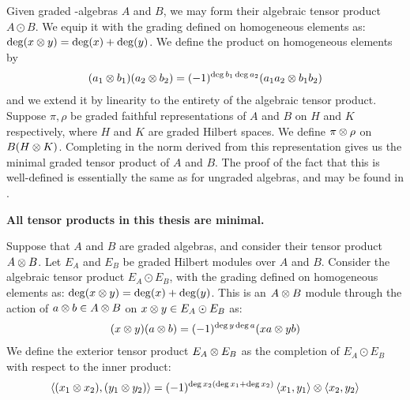 \begin{definition}
	Given graded \Cstar-algebras $A$ and $B$, we may form their algebraic tensor product $A\odot B$. We equip it with the grading defined on homogeneous elements as: $\deg(x\otimes y)=\deg(x)+\deg(y)$. We define the product on homogeneous elements by 
	\begin{align*}
		(a_1\otimes b_1)(a_2\otimes b_2)=(-1)^{\deg b_1 \deg a_2}(a_1a_2\otimes b_1b_2)
	\end{align*}
	and we extend it by linearity to the entirety of the algebraic tensor product.
	Suppose $\pi,\rho$ be graded faithful representations of $A$ and $B$ on $H$ and $K$ respectively, where $H$ and $K$ are graded Hilbert spaces. We define $\pi \otimes \rho$ on $B(H\otimes  K)$. 
	Completing in the norm derived from this representation gives us the minimal graded tensor product of $A$ and $B$. The proof of the fact that this is well-defined is essentially the same as for ungraded \Cstar algebras, and may be found in \cite{kasparovhilbert}. 
\end{definition}
\textbf{All tensor products in this thesis are minimal.}
\begin{definition}
	Suppose that $A$ and $B$ are graded \Cstar algebras, and consider their tensor product $A\otimes B$. Let $E_A$ and $E_B$ be graded Hilbert modules over $A$ and $B$. 
	Consider the algebraic tensor product $E_A\odot E_B$, with the grading defined on homogeneous elements as: $\deg(x\otimes y)=\deg(x)+\deg(y)$.
	This is an $A\otimes B$ module through the action of $a\otimes b\in A\otimes B$ on $x\otimes y\in E_A\odot E_B$ as:
	\begin{align*}
		(x\otimes y)(a\otimes b)=(-1)^{\deg y \deg a} (xa\otimes yb)
	\end{align*}
	We define the exterior tensor product $E_A\otimes E_B$ as the completion of $E_A\odot E_B$ with respect to the inner product:
	\begin{align*}
		\left \langle (x_1\otimes x_2),(y_1\otimes y_2) \right \rangle=(-1)^{\deg x_2(\deg x_1+\deg x_2)}\left \langle x_1,y_1 \right \rangle\otimes \left \langle x_2,y_2 \right \rangle
	\end{align*}
\end{definition}
